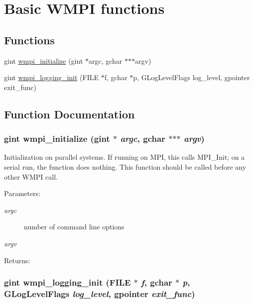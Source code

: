 \hypertarget{group__WMPI}{
\section{Basic WMPI functions}
\label{group__WMPI}
}
\subsection*{Functions}
\begin{CompactItemize}
\item 
gint \hyperlink{group__WMPI_g7f4486d63f4ac8fe5c2a91a94678bdac}{wmpi\_\-initialize} (gint $\ast$argc, gchar $\ast$$\ast$$\ast$argv)
\item 
gint \hyperlink{group__WMPI_g65f9729b3ae505d12878ecdcdb616ec9}{wmpi\_\-logging\_\-init} (FILE $\ast$f, gchar $\ast$p, GLogLevelFlags log\_\-level, gpointer exit\_\-func)
\end{CompactItemize}


\subsection{Function Documentation}
\hypertarget{group__WMPI_g7f4486d63f4ac8fe5c2a91a94678bdac}{
\subsubsection{\setlength{\rightskip}{0pt plus 5cm}gint wmpi\_\-initialize (gint $\ast$ {\em argc}, gchar $\ast$$\ast$$\ast$ {\em argv})}}
\label{group__WMPI_g7f4486d63f4ac8fe5c2a91a94678bdac}


Initialization on parallel systems. If running on MPI, this calls MPI\_\-Init; on a serial run, the function does nothing. This function should be called before any other WMPI call.

\begin{Desc}
\item[Parameters:]
\begin{description}
\item[{\em argc}]number of command line options \item[{\em argv}]\end{description}
\end{Desc}
\begin{Desc}
\item[Returns:]\end{Desc}
\hypertarget{group__WMPI_g65f9729b3ae505d12878ecdcdb616ec9}{
\subsubsection{\setlength{\rightskip}{0pt plus 5cm}gint wmpi\_\-logging\_\-init (FILE $\ast$ {\em f}, gchar $\ast$ {\em p}, GLogLevelFlags {\em log\_\-level}, gpointer {\em exit\_\-func})}}
\label{group__WMPI_g65f9729b3ae505d12878ecdcdb616ec9}


